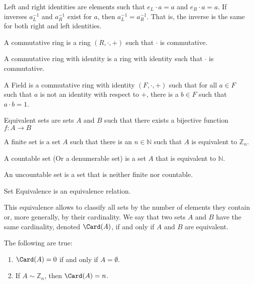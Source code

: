         Left and right identities are elements such that ${e_{L}}\cdot{a}=a$
        and ${e_{R}}\cdot{a}=a$. If inverses $a_{L}^{-1}$ and $a_{R}^{-1}$
        exist for $a$, then $a_{L}^{-1}=a_{R}^{-1}$. That is, the inverse
        is the same for both right and left identities.
        \begin{definition}
            A commutative ring is a ring $(R,\cdot,+)$ such that
            $\cdot$ is commutative.
        \end{definition}
        \begin{definition}
            A commutative ring with identity is a ring with identity such
            that $\cdot$ is commutative.
        \end{definition}
        \begin{definition}
            A Field is a commutative ring with identity $(F,\cdot,+)$ such
            that for all ${a}\in{F}$ such that $a$ is not an identity with
            respect to $+$, there is a $b\in{F}$ such that ${a}\cdot{b}=1$.
        \end{definition}
        \begin{definition}
            Equivalent sets are sets $A$ and $B$ such that there exists a
            bijective function $f:{A}\rightarrow{B}$
        \end{definition}
        \begin{definition}
            A finite set is a set $A$ such that there is an
            ${n}\in{\mathbb{N}}$ such that $A$ is equivalent to
            $\mathbb{Z}_{n}$.
        \end{definition}
        \begin{definition}
            A countable set (Or a denumerable set) is a set $A$ that is
            equivalent to $\mathbb{N}$.
        \end{definition}
        \begin{definition}
            An uncountable set is a set that is neither finite nor countable.
        \end{definition}
        \begin{theorem}
            Set Equivalence is an equivalence relation.
        \end{theorem}
        This equivalence allows to classify all sets by the
        number of elements they contain or, more generally,
        by their cardinality. We say that two sets $A$ and
        $B$ have the same cardinality, denoted
        $\Card(A)$, if and only if $A$ and $B$ are equivalent.
        \begin{theorem}
            The following are true:
            \begin{enumerate}
                \item $\Card(A)=0$ if and only if $A=\emptyset$.
                \item If ${A}\sim{\mathbb{Z}_{n}}$, then $\Card(A)=n$.
            \end{enumerate}
        \end{theorem}
